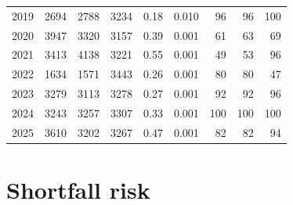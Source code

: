 \begin{longtable}{@{}rrrrrrrrr@{}}
2019 & 2694 & 2788 & 3234 & 0.18 & 0.010 & 96 & 96 & 100 \\
2020 & 3947 & 3320 & 3157 & 0.39 & 0.001 & 61 & 63 & 69 \\
2021 & 3413 & 4138 & 3221 & 0.55 & 0.001 & 49 & 53 & 96 \\
2022 & 1634 & 1571 & 3443 & 0.26 & 0.001 & 80 & 80 & 47 \\
2023 & 3279 & 3113 & 3278 & 0.27 & 0.001 & 92 & 92 & 96 \\
2024 & 3243 & 3257 & 3307 & 0.33 & 0.001 & 100 & 100 & 100 \\
2025 & 3610 & 3202 & 3267 & 0.47 & 0.001 & 82 & 82 & 94 \\
\bottomrule
\end{longtable}
\endgroup


\section{Shortfall risk}

